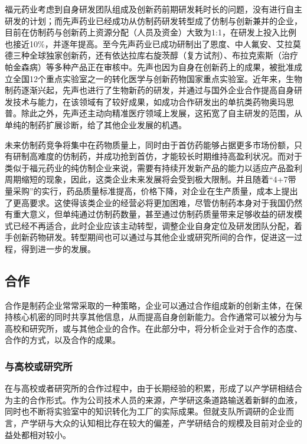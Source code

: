 \documentclass{apa6}
\begin{document}
			福元药业考虑到自身研发团队组成及创新药前期研发耗时长的问题，没有进行自主研发的计划；而先声药业已经成功从仿制药研发转型成了仿制与创新兼并的企业，目前在仿制药与创新药上资源分配（人员及资金）大致为1:1，在研发上投入比例也接近10\%，并逐年提高。至今先声药业已成功研制出了恩度、中人氟安、艾拉莫德三种全球独家创新药，还有依达拉库右旋茨醇（复方试剂）、布拉克索斯（治疗帕金森病）等多种产品正在审核中。先声也因为自身在创新药上的成果，被批准成立全国12个重点实验室之一的转化医学与创新药物国家重点实验室。近年来，生物制药逐渐兴起，先声也进行了生物新药的研发，并通过与国外企业合作提高自身研发技术与能力，在该领域有了较好成果，如成功合作研发出的单抗类药物奥玛思普。除此之外，先声还主动向精准医疗领域上发展，这拓宽了自主研发的范围，从单纯的制药扩展诊断，给了其他企业发展的机遇。
			
			\begin{framed}
				未来仿制药竞争将集中在药物质量上，同时由于首仿药能够占据更多市场份额，只有研制高难度的仿制药，并成功抢到首仿，才能较长时期维持高盈利状况。而对于类似于福元药业的纯仿制企业来说，需要有持续开发新产品的能力以适应产品盈利周期缩短的现象，因此，这类企业未来发展将会受到极大限制。并且随着“4+7带量采购”的实行，药品质量标准提高，价格下降，对企业在生产质量，成本上提出了更高要求。这使得该类企业的经营必将更加困难，尽管仿制药本身对于我国仍然有重大意义，但单纯通过仿制药数量，甚至通过仿制药质量带来足够收益的研发模式已经不再适合，此时企业应该主动转型，调整企业自身定位及研发团队分配，着手创新药物研发。转型期间也可以通过与其他企业或研究所间的合作，促进这一过程，得到进一步的发展。
			\end{framed}
			
		\subsection{合作}
		合作是制药企业常常采取的一种策略，企业可以通过合作组成新的创新主体，在保持核心机密的同时共享其他信息，从而提高自身创新能力。合作通常可以被分为与高校和研究所，或与其他企业的合作。在此部分中，将分析企业对于合作的态度、合作的方式，以及合作的成果。
		
			\subsubsection{与高校或研究所}
			在与高校或者研究所的合作过程中，由于长期经验的积累，形成了以产学研相结合为主的合作形式。作为公司技术人员的来源，产学研这条道路输送着新鲜的血液，同时也不断将实验室中的知识转化为工厂的实际成果。但就支队所调研的企业而言，产学研与大众的认知相比存在较大的偏差，产学研结合的规模及目前对企业的益处都相对较小。
			
\end{document}
